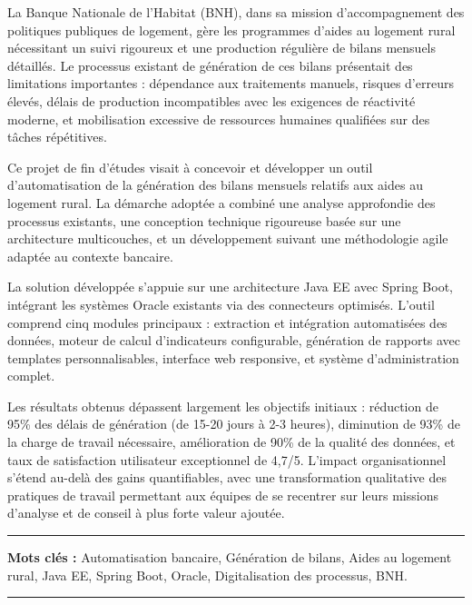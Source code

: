 
La Banque Nationale de l'Habitat (BNH), dans sa mission d'accompagnement des politiques publiques de logement, gère les programmes d'aides au logement rural nécessitant un suivi rigoureux et une production régulière de bilans mensuels détaillés. Le processus existant de génération de ces bilans présentait des limitations importantes : dépendance aux traitements manuels, risques d'erreurs élevés, délais de production incompatibles avec les exigences de réactivité moderne, et mobilisation excessive de ressources humaines qualifiées sur des tâches répétitives.

\medskip

Ce projet de fin d'études visait à concevoir et développer un outil d'automatisation de la génération des bilans mensuels relatifs aux aides au logement rural. La démarche adoptée a combiné une analyse approfondie des processus existants, une conception technique rigoureuse basée sur une architecture multicouches, et un développement suivant une méthodologie agile adaptée au contexte bancaire.

\medskip

La solution développée s'appuie sur une architecture Java EE avec Spring Boot, intégrant les systèmes Oracle existants via des connecteurs optimisés. L'outil comprend cinq modules principaux : extraction et intégration automatisées des données, moteur de calcul d'indicateurs configurable, génération de rapports avec templates personnalisables, interface web responsive, et système d'administration complet.

\medskip

Les résultats obtenus dépassent largement les objectifs initiaux : réduction de 95\% des délais de génération (de 15-20 jours à 2-3 heures), diminution de 93\% de la charge de travail nécessaire, amélioration de 90\% de la qualité des données, et taux de satisfaction utilisateur exceptionnel de 4,7/5. L'impact organisationnel s'étend au-delà des gains quantifiables, avec une transformation qualitative des pratiques de travail permettant aux équipes de se recentrer sur leurs missions d'analyse et de conseil à plus forte valeur ajoutée.

\vspace{1cm}

\noindent\rule[2pt]{\textwidth}{0.5pt}

{\textbf{Mots clés :}}
Automatisation bancaire, Génération de bilans, Aides au logement rural, Java EE, Spring Boot, Oracle, Digitalisation des processus, BNH.
\\
\noindent\rule[2pt]{\textwidth}{0.5pt}

